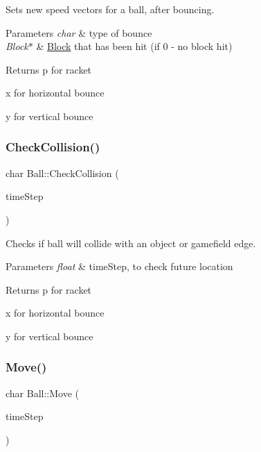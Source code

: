 Sets new speed vectors for a ball, after bouncing. 


\begin{DoxyParams}{Parameters}
{\em char} & type of bounce \\
\hline
{\em Block$\ast$} & \hyperlink{class_block}{Block} that has been hit (if 0 -\/ no block hit)\\
\hline
\end{DoxyParams}
\begin{DoxyReturn}{Returns}
\textquotesingle{}p\textquotesingle{} for racket 

\textquotesingle{}x\textquotesingle{} for horizontal bounce 

\textquotesingle{}y\textquotesingle{} for vertical bounce 
\end{DoxyReturn}
\mbox{\label{class_ball_aebe80a6c3933f8fc029259a9b93b69c3}} 
\subsubsection{\texorpdfstring{Check\+Collision()}{CheckCollision()}}
{\footnotesize\ttfamily char Ball\+::\+Check\+Collision (\begin{DoxyParamCaption}\item[{float}]{time\+Step }\end{DoxyParamCaption})}



Checks if ball will collide with an object or gamefield edge. 


\begin{DoxyParams}{Parameters}
{\em float} & time\+Step, to check future location\\
\hline
\end{DoxyParams}
\begin{DoxyReturn}{Returns}
\textquotesingle{}p\textquotesingle{} for racket 

\textquotesingle{}x\textquotesingle{} for horizontal bounce 

\textquotesingle{}y\textquotesingle{} for vertical bounce 
\end{DoxyReturn}
\mbox{\label{class_ball_a6afd96091f6ddeaf12c77c7a3857f3f9}} 
\subsubsection{\texorpdfstring{Move()}{Move()}}
{\footnotesize\ttfamily char Ball\+::\+Move (\begin{DoxyParamCaption}\item[{float}]{time\+Step }\end{DoxyParamCaption})}



